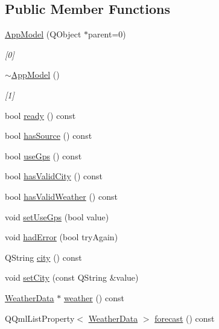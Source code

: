 \subsection*{Public Member Functions}
\begin{DoxyCompactItemize}
\item 
\hyperlink{class_app_model_affb3ea459bceb0650cdc810f3f5a2256}{App\+Model} (Q\+Object $\ast$parent=0)
\begin{DoxyCompactList}\small\item\em \mbox{[}0\mbox{]} \end{DoxyCompactList}\item 
\hyperlink{class_app_model_a67ab3004ccbe2822a8a0abb9fa96ace3}{$\sim$\+App\+Model} ()
\begin{DoxyCompactList}\small\item\em \mbox{[}1\mbox{]} \end{DoxyCompactList}\item 
bool \hyperlink{class_app_model_a3917fdc3dd8c97715991d9fd1a23abcc}{ready} () const
\item 
bool \hyperlink{class_app_model_a8ad68e982b0a307d9986ff538baedbd2}{has\+Source} () const
\item 
bool \hyperlink{class_app_model_a0e6e7506ba084133a6927d8c633ad699}{use\+Gps} () const
\item 
bool \hyperlink{class_app_model_aedeadab67d9bc5f5dfead369f66c3912}{has\+Valid\+City} () const
\item 
bool \hyperlink{class_app_model_a6ec5b34a1839a7141979709418174ad1}{has\+Valid\+Weather} () const
\item 
void \hyperlink{class_app_model_a81c3ffb3370837086366c9f70bb3d5eb}{set\+Use\+Gps} (bool value)
\item 
void \hyperlink{class_app_model_ac5fe590924b727724d9c686bb2552ed8}{had\+Error} (bool try\+Again)
\item 
Q\+String \hyperlink{class_app_model_a093066c81b5fe2c1361df8fd19a21f51}{city} () const
\item 
void \hyperlink{class_app_model_ad0135d4a1551b6484ac28c434f861af5}{set\+City} (const Q\+String \&value)
\item 
\hyperlink{class_weather_data}{Weather\+Data} $\ast$ \hyperlink{class_app_model_a70a5bec8e359e4edbd16611efa96cf32}{weather} () const
\item 
Q\+Qml\+List\+Property$<$ \hyperlink{class_weather_data}{Weather\+Data} $>$ \hyperlink{class_app_model_aa9209b2390924841a009ab0d22b9a1b3}{forecast} () const
\end{DoxyCompactItemize}
